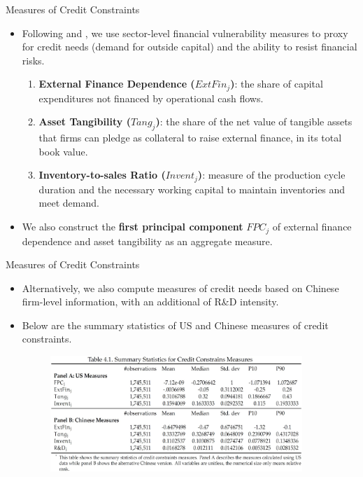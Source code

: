 \documentclass[10pt]{beamer}
\begin{document}
\begin{frame}{Measures of Credit Constraints}
	\begin{itemize}
		\item Following \cite{manova-wei-zhang2015} and \cite{fan-lai-li2015}, we use sector-level financial vulnerability measures to proxy for credit needs (demand for outside capital) and the ability to resist financial risks.
		\begin{enumerate}
			\item \textbf{External Finance Dependence ($ExtFin_j$)}: the share of capital expenditures not financed by operational cash flows.
			\item \textbf{Asset Tangibility ($Tang_j$)}: the share of the net value of tangible assets that firms can pledge as collateral to raise external finance, in its total book value.
			\item \textbf{Inventory-to-sales Ratio ($Invent_j$)}: measure of the production cycle duration and the necessary working capital to maintain inventories and meet demand. 
		\end{enumerate}
		\item We also construct the \textbf{first principal component} $FPC_j$ of external finance dependence and asset tangibility as an aggregate measure.
	\end{itemize}
\end{frame}

\begin{frame}{Measures of Credit Constraints}
	\begin{itemize}
		\item Alternatively, we also compute measures of credit needs based on Chinese firm-level information, with an additional of R\&D intensity.
		\item Below are the summary statistics of US and Chinese measures of credit constraints.
		\begin{figure}[htbp]
			\centering
			\includegraphics[width=0.9\textwidth]{Table4.1.jpg}
			\label{tab4.1}
		\end{figure}
	\end{itemize}
\end{frame}
\end{document}
